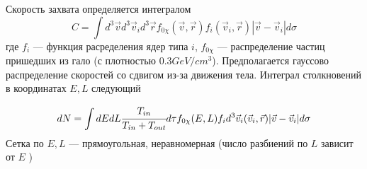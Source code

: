Скорость захвата определяется интегралом
\begin{equation*}
	C = \int{d^3\vec{v}d^3\vec{v}_i d^3\vec{r}f_{0\chi}(\vec{v},\vec{r})f_{i}(\vec{v}_i,\vec{r})|\vec{v}-\vec{v}_i|d\sigma}
\end{equation*}
где $f_{i}$ --- функция расределения ядер типа $i$, $f_{0\chi}$ --- распределение частиц пришедших из гало (с плотностью $0.3 GeV/cm^3$).
Предполагается гауссово распределение скоростей со сдвигом из-за  движения тела.
Интеграл столкновений в координатах $E,L$ следующий

\begin{equation*}
	dN = \int{dEdL \cfrac{T_{in}}{T_{in}+T_{out}} d\tau f_{0\chi}(E,L)f_{i} d^3\vec{v}_i(\vec{v}_i,\vec{r})|\vec{v}-\vec{v}_i|d\sigma}
\end{equation*}
Сетка по $E, L$ --- прямоугольная, неравномерная (число разбиений по $L$ зависит от $E$ ) 